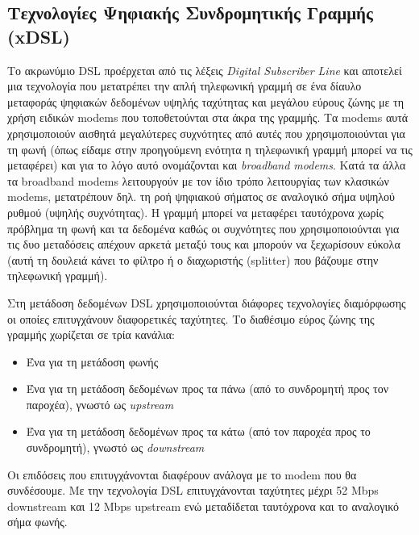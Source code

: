%
%
\setcounter{subsection}{3}
\subsection{Τεχνολογίες Ψηφιακής Συνδρομητικής Γραμμής (xDSL)}

Το ακρωνύμιο DSL προέρχεται από τις λέξεις \emph{Digital Subscriber Line} και αποτελεί μια τεχνολογία που μετατρέπει την απλή τηλεφωνική γραμμή σε ένα δίαυλο μεταφοράς ψηφιακών δεδομένων υψηλής ταχύτητας και μεγάλου εύρους ζώνης με τη χρήση ειδικών modems που τοποθετούνται στα άκρα της γραμμής. Τα modems αυτά χρησιμοποιούν αισθητά μεγαλύτερες συχνότητες από αυτές που χρησιμοποιούνται για τη φωνή (όπως είδαμε στην προηγούμενη ενότητα  η τηλεφωνική γραμμή μπορεί να τις μεταφέρει) και για το λόγο αυτό ονομάζονται και \emph{broadband modems}. Κατά τα άλλα τα broadband modems  λειτουργούν με τον ίδιο τρόπο λειτουργίας των κλασικών modems, μετατρέπουν δηλ. τη ροή ψηφιακού σήματος  σε αναλογικό σήμα υψηλού ρυθμού (υψηλής συχνότητας). Η γραμμή μπορεί να μεταφέρει ταυτόχρονα χωρίς πρόβλημα τη φωνή και τα δεδομένα καθώς οι συχνότητες που χρησιμοποιούνται για τις δυο μεταδόσεις απέχουν αρκετά μεταξύ τους και μπορούν να ξεχωρίσουν εύκολα (αυτή τη δουλειά κάνει το φίλτρο ή ο διαχωριστής (splitter) που βάζουμε στην τηλεφωνική γραμμή).

Στη μετάδοση δεδομένων DSL χρησιμοποιούνται διάφορες τεχνολογίες διαμόρφωσης οι οποίες επιτυγχάνουν διαφορετικές ταχύτητες. Το διαθέσιμο εύρος ζώνης της γραμμής χωρίζεται σε τρία κανάλια:

\begin{itemize}
\item Ένα για τη μετάδοση φωνής
\item Ένα για τη μετάδοση δεδομένων προς τα πάνω (από το συνδρομητή προς τον παροχέα), γνωστό ως \emph{upstream}
\item Ένα για τη μετάδοση δεδομένων προς τα κάτω (από τον παροχέα προς το συνδρομητή), γνωστό ως \emph{downstream}
\end{itemize}

Οι επιδόσεις που επιτυγχάνονται διαφέρουν ανάλογα με το modem που θα συνδέσουμε. Με την τεχνολογία DSL επιτυγχάνονται ταχύτητες μέχρι 52 Mbps down\-stream και 12 Mbps upstream ενώ  μεταδίδεται ταυτόχρονα και το αναλογικό σήμα φωνής.

